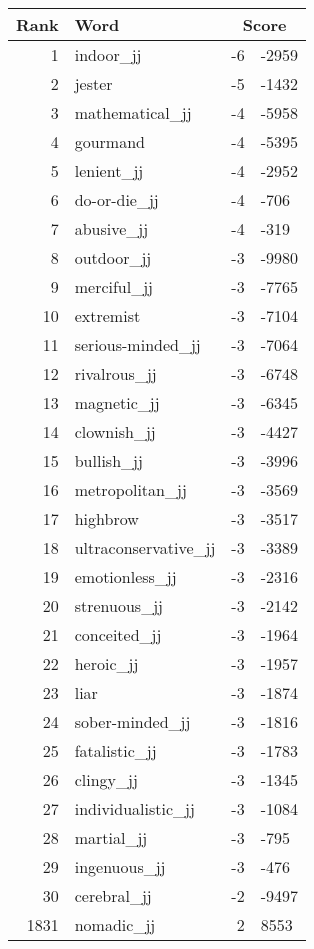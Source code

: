 \begin{longtable}[!htbp]{| rlr@{.}l |}
    \hline
    \textbf{Rank} & \textbf{Word} & \multicolumn{2}{c|}{\textbf{Score}} \\
    \hline
    \endhead
    1 & indoor\_jj & -6 & -2959 \\
    2 & jester & -5 & -1432 \\
    3 & mathematical\_jj & -4 & -5958 \\
    4 & gourmand & -4 & -5395 \\
    5 & lenient\_jj & -4 & -2952 \\
    6 & do-or-die\_jj & -4 & -706 \\
    7 & abusive\_jj & -4 & -319 \\
    8 & outdoor\_jj & -3 & -9980 \\
    9 & merciful\_jj & -3 & -7765 \\
    10 & extremist & -3 & -7104 \\
    11 & serious-minded\_jj & -3 & -7064 \\
    12 & rivalrous\_jj & -3 & -6748 \\
    13 & magnetic\_jj & -3 & -6345 \\
    14 & clownish\_jj & -3 & -4427 \\
    15 & bullish\_jj & -3 & -3996 \\
    16 & metropolitan\_jj & -3 & -3569 \\
    17 & highbrow & -3 & -3517 \\
    18 & ultraconservative\_jj & -3 & -3389 \\
    19 & emotionless\_jj & -3 & -2316 \\
    20 & strenuous\_jj & -3 & -2142 \\
    21 & conceited\_jj & -3 & -1964 \\
    22 & heroic\_jj & -3 & -1957 \\
    23 & liar & -3 & -1874 \\
    24 & sober-minded\_jj & -3 & -1816 \\
    25 & fatalistic\_jj & -3 & -1783 \\
    26 & clingy\_jj & -3 & -1345 \\
    27 & individualistic\_jj & -3 & -1084 \\
    28 & martial\_jj & -3 & -795 \\
    29 & ingenuous\_jj & -3 & -476 \\
    30 & cerebral\_jj & -2 & -9497 \\
    1831 & nomadic\_jj & 2 & 8553 \\

\end{longtable}
